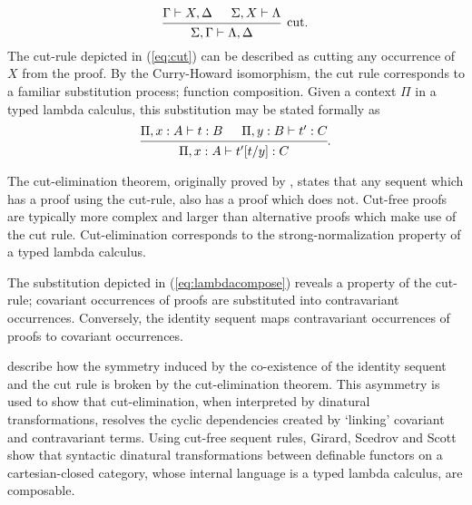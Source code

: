 \documentclass[../../Dissertation.tex]{subfiles}
\begin{document}
\begin{equation}\label{eq:cut}
\begin{prooftree}
  \hypo{\Gamma \vdash X, \Delta}
  \hypo{\Sigma, X \vdash \Lambda}
  \infer2[cut]{\Sigma, \Gamma \vdash \Lambda, \Delta}
\end{prooftree}.
\end{equation}
The cut-rule depicted in (\ref{eq:cut}) can be described as cutting any occurrence of $X$ from the proof. By the Curry-Howard isomorphism, the cut rule corresponds to a familiar substitution process; function composition. Given a context $\Pi$ in a typed lambda calculus, this substitution may be stated formally as
\begin{equation}\label{eq:lambdacompose}
\begin{prooftree}
  \hypo{\Pi, x : A \vdash t : B}
  \hypo{\Pi, y : B \vdash t' : C}
  \infer2[]{\Pi, x : A \vdash t'[t/y] : C}
\end{prooftree}.
\end{equation}
\par
The cut-elimination theorem, originally proved by , states that any sequent which has a proof using the cut-rule, also has a proof which does not. Cut-free proofs are typically more complex and larger than alternative proofs which make use of the cut rule. Cut-elimination corresponds to the strong-normalization property of a typed lambda calculus.
\par
The substitution depicted in (\ref{eq:lambdacompose}) reveals a property of the cut-rule; covariant occurrences of proofs are substituted into contravariant occurrences. Conversely, the identity sequent maps contravariant occurrences of proofs to covariant occurrences. 
\par
{} describe how the symmetry induced by the co-existence of the identity sequent and the cut rule is broken by the cut-elimination theorem. This asymmetry is used to show that cut-elimination, when interpreted by dinatural transformations, resolves the cyclic dependencies created by `linking' covariant and contravariant terms. Using cut-free sequent rules, Girard, Scedrov and Scott show that syntactic dinatural transformations between definable functors on a cartesian-closed category, whose internal language is a typed lambda calculus, are composable.
\end{document}
